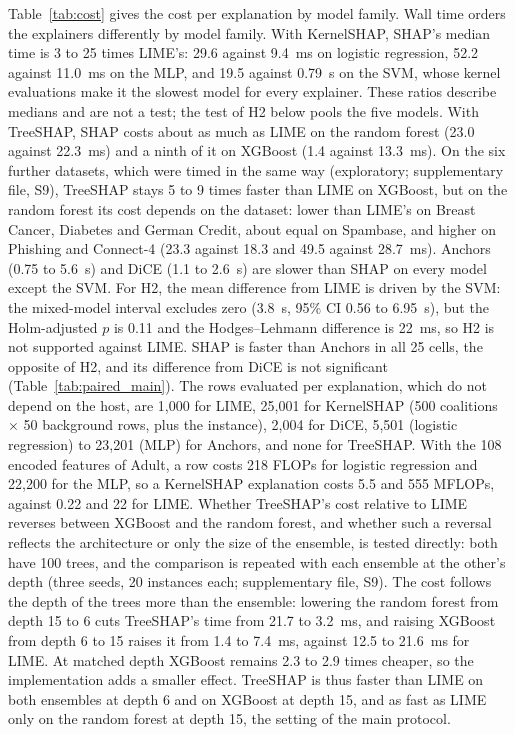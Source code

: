 \documentclass[11pt,a4paper]{article}
\begin{document}
Table~\ref{tab:cost} gives the cost per explanation by model family.
Wall time orders the explainers differently by model family. With
KernelSHAP, SHAP's median time is 3 to 25 times LIME's: 29.6 against 9.4~ms on
logistic regression, 52.2 against 11.0~ms on the MLP, and 19.5 against
0.79~s on the SVM, whose kernel evaluations make it the slowest model for
every explainer. These ratios describe medians and are not a test; the test of H2 below
pools the five models. With TreeSHAP, SHAP costs about as much as LIME on the
random forest (23.0 against 22.3~ms) and a ninth of it on XGBoost (1.4
against 13.3~ms). On the six further datasets, which were timed in the
same way (exploratory; supplementary file, S9), TreeSHAP stays 5 to 9
times faster than LIME on XGBoost, but on the random forest its cost
depends on the dataset: lower than LIME's on Breast Cancer, Diabetes and
German Credit, about equal on Spambase, and higher on Phishing and
Connect-4 (23.3 against 18.3 and 49.5 against 28.7~ms). Anchors (0.75 to 5.6~s) and DiCE (1.1 to 2.6~s) are
slower than SHAP on every model except the SVM. For H2, the mean difference
from LIME is driven by the SVM: the mixed-model interval excludes zero (3.8~s,
95\% CI 0.56 to 6.95~s), but the Holm-adjusted $p$ is 0.11 and the
Hodges--Lehmann difference is 22~ms, so H2 is not supported against LIME.
SHAP is faster than Anchors in all 25 cells, the opposite of H2, and its
difference from DiCE is not significant (Table~\ref{tab:paired_main}). The
rows evaluated per explanation, which do not depend on the host, are 1,000
for LIME, 25,001 for KernelSHAP (500 coalitions $\times$ 50 background rows,
plus the instance), 2,004 for DiCE, 5,501 (logistic regression) to 23,201
(MLP) for Anchors, and none for TreeSHAP. With the 108 encoded features of
Adult, a row costs 218 FLOPs for logistic regression and 22,200 for the MLP,
so a KernelSHAP explanation costs 5.5 and 555 MFLOPs, against 0.22 and 22
for LIME. Whether TreeSHAP's cost relative to LIME reverses between
XGBoost and the random forest, and whether such a reversal reflects the
architecture or only the size of the ensemble, is tested directly: both have
100 trees, and the comparison is repeated with each ensemble at the other's
depth (three seeds, 20 instances each; supplementary file, S9). The cost
follows the depth of the trees more than the ensemble: lowering the random
forest from depth 15 to 6 cuts TreeSHAP's time from 21.7 to 3.2~ms, and
raising XGBoost from depth 6 to 15 raises it from 1.4 to 7.4~ms, against
12.5 to 21.6~ms for LIME. At matched depth XGBoost remains 2.3 to 2.9 times
cheaper, so the implementation adds a smaller effect. TreeSHAP is thus
faster than LIME on both ensembles at depth 6 and on XGBoost at depth 15,
and as fast as LIME only on the random forest at depth 15, the setting of the
main protocol.
\end{document}
